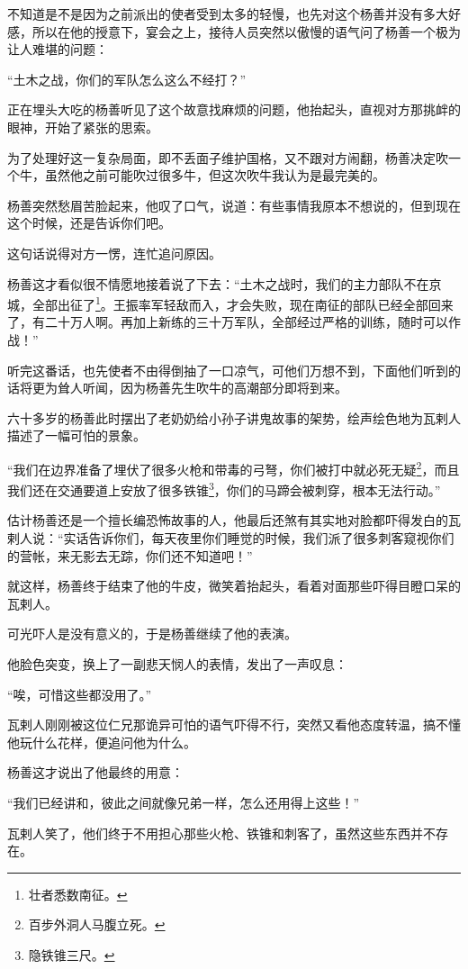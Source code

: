 \begin{multicols}{\theparacolNo}
不知道是不是因为之前派出的使者受到太多的轻慢，也先对这个杨善并没有多大好感，所以在他的授意下，宴会之上，接待人员突然以傲慢的语气问了杨善一个极为让人难堪的问题：

“土木之战，你们的军队怎么这么不经打？”

正在埋头大吃的杨善听见了这个故意找麻烦的问题，他抬起头，直视对方那挑衅的眼神，开始了紧张的思索。

为了处理好这一复杂局面，即不丢面子维护国格，又不跟对方闹翻，杨善决定吹一个牛，虽然他之前可能吹过很多牛，但这次吹牛我认为是最完美的。

杨善突然愁眉苦脸起来，他叹了口气，说道：有些事情我原本不想说的，但到现在这个时候，还是告诉你们吧。

这句话说得对方一愣，连忙追问原因。

杨善这才看似很不情愿地接着说了下去：“土木之战时，我们的主力部队不在京城，全部出征了\footnote{壮者悉数南征。}。王振率军轻敌而入，才会失败，现在南征的部队已经全部回来了，有二十万人啊。再加上新练的三十万军队，全部经过严格的训练，随时可以作战！”

听完这番话，也先使者不由得倒抽了一口凉气，可他们万想不到，下面他们听到的话将更为耸人听闻，因为杨善先生吹牛的高潮部分即将到来。

六十多岁的杨善此时摆出了老奶奶给小孙子讲鬼故事的架势，绘声绘色地为瓦剌人描述了一幅可怕的景象。

“我们在边界准备了埋伏了很多火枪和带毒的弓弩，你们被打中就必死无疑\footnote{百步外洞人马腹立死。}，而且我们还在交通要道上安放了很多铁锥\footnote{隐铁锥三尺。}，你们的马蹄会被刺穿，根本无法行动。”

估计杨善还是一个擅长编恐怖故事的人，他最后还煞有其实地对脸都吓得发白的瓦剌人说：“实话告诉你们，每天夜里你们睡觉的时候，我们派了很多刺客窥视你们的营帐，来无影去无踪，你们还不知道吧！”

就这样，杨善终于结束了他的牛皮，微笑着抬起头，看着对面那些吓得目瞪口呆的瓦剌人。

可光吓人是没有意义的，于是杨善继续了他的表演。

他脸色突变，换上了一副悲天悯人的表情，发出了一声叹息：

“唉，可惜这些都没用了。”

瓦剌人刚刚被这位仁兄那诡异可怕的语气吓得不行，突然又看他态度转温，搞不懂他玩什么花样，便追问他为什么。

杨善这才说出了他最终的用意：

“我们已经讲和，彼此之间就像兄弟一样，怎么还用得上这些！”

瓦剌人笑了，他们终于不用担心那些火枪、铁锥和刺客了，虽然这些东西并不存在。


\end{multicols}
